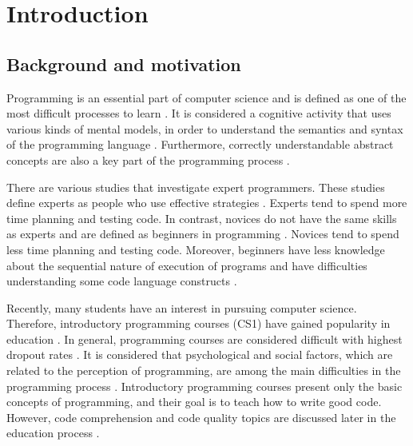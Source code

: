 %
%

\chapter{Introduction}
\label{sec:introduction}


\section{Background and motivation}

Programming is an essential part of computer science and is defined as one of the most difficult processes to learn \cite{andrzejewska2020development}. It is considered a cognitive activity that uses various kinds of mental models, in order to understand the semantics and syntax of the programming language \cite{andrzejewska2020development}.
Furthermore, correctly understandable abstract concepts are also a key part of the programming process \cite{lahtinen2005study}.

There are various studies that investigate expert programmers. These studies define experts as people who use effective strategies \cite{robins2003learning}.   Experts tend to spend more time planning and testing code. In contrast, novices do not have the same skills as experts and are defined as beginners in programming \cite{robins2003learning}. Novices tend to spend less time planning and testing code. Moreover, beginners have less knowledge about the sequential nature of execution of programs and have difficulties understanding some code language constructs \cite{robins2003learning}.


Recently, many students have an interest in pursuing computer science. Therefore, introductory programming courses (CS1) have gained popularity in education \cite{robins2003learning}. In general, programming courses are considered difficult with highest dropout rates \cite{robins2003learning}. It is considered that psychological and social factors, which are related to the perception of programming, are among the main difficulties in the programming process \cite{andrzejewska2020development}. Introductory programming courses present only the basic concepts of programming, and their goal is to teach how to write good code. However, code comprehension and code quality topics are discussed later in the education process \cite{ inproceedings}.

